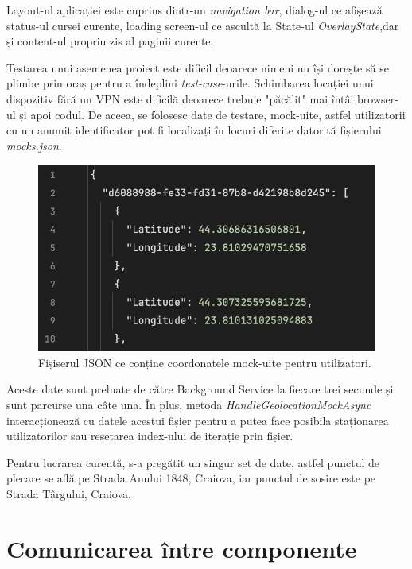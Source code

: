 Layout-ul aplicației este cuprins dintr-un \textit{navigation bar}, dialog-ul ce afișează status-ul cursei curente, loading screen-ul
ce ascultă la State-ul \textit{OverlayState},dar și content-ul propriu zis al paginii curente.

Testarea unui asemenea proiect este dificil deoarece nimeni nu își dorește să se plimbe prin oraș pentru a îndeplini \textit{test-case}-urile.
Schimbarea locației unui dispozitiv fără un VPN este dificilă deoarece trebuie "păcălit" mai întâi browser-ul și apoi codul.
De aceea, se folosesc date de testare, mock-uite, astfel utilizatorii cu un anumit identificator pot fi localizați în locuri
diferite datorită fișierului \textit{mocks.json}.

\begin{figure}[H]
    \centering
    \includegraphics[width=14cm]{Assets/dynamicMocks.png}
    \caption{Fișiserul JSON ce conține coordonatele mock-uite pentru utilizatori.}
    \label{fig:dynamicMocks}
\end{figure}

Aceste date sunt preluate de către Background Service la fiecare trei secunde și sunt parcurse una câte una.
În plus, metoda \textit{HandleGeolocationMockAsync} interacționează cu datele acestui fișier pentru a putea
face posibila staționarea utilizatorilor sau resetarea index-ului de iterație prin fișier.

Pentru lucrarea curentă, s-a pregătit un singur set de date, astfel punctul de plecare se află
pe Strada Anului 1848, Craiova, iar punctul de sosire este pe Strada Târgului, Craiova.

\section{Comunicarea între componente}

